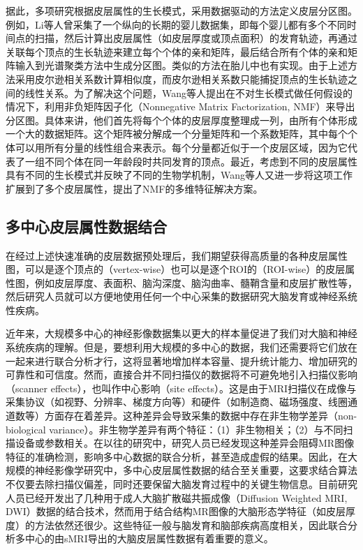 据此，多项研究根据皮层属性的生长模式，采用数据驱动的方法定义皮层分区图。例如，Li等人\cite{li2015parcellation}曾采集了一个纵向的长期的婴儿数据集，即每个婴儿都有多个不同时间点的扫描，然后计算出皮层属性（如皮层厚度或顶点面积）的发育轨迹，再通过关联每个顶点的生长轨迹来建立每个个体的亲和矩阵，最后结合所有个体的亲和矩阵输入到光谱聚类方法中生成分区图。类似的方法在胎儿中也有实现\cite{xia2019fetal}。由于上述方法采用皮尔逊相关系数计算相似度，而皮尔逊相关系数只能捕捉顶点的生长轨迹之间的线性关系。为了解决这个问题，Wang等人\cite{wang2019developmental}提出在不对生长模式做任何假设的情况下，利用非负矩阵因子化（Nonnegative Matrix Factorization, NMF）来导出分区图。具体来讲，他们首先将每个个体的皮层厚度整理成一列，由所有个体形成一个大的数据矩阵。这个矩阵被分解成一个分量矩阵和一个系数矩阵，其中每个个体可以用所有分量的线性组合来表示。每个分量都近似于一个皮层区域，因为它代表了一组不同个体在同一年龄段时共同发育的顶点。最近，考虑到不同的皮层属性具有不同的生长模式并反映了不同的生物学机制，Wang等人又进一步\cite{wang2019revealing}将这项工作扩展到了多个皮层属性，提出了NMF的多维特征解决方案。


\subsection{多中心皮层属性数据结合}\label{sec:绪论_多中心皮层属性数据结合}
在经过上述快速准确的皮层数据预处理后，我们期望获得高质量的各种皮层属性图，可以是逐个顶点的（vertex-wise）也可以是逐个ROI的（ROI-wise）的皮层属性图，例如皮层厚度、表面积、脑沟深度、脑沟曲率、髓鞘含量和皮层扩散性等，然后研究人员就可以方便地使用任何一个中心采集的数据研究大脑发育或神经系统性疾病。

近年来，大规模多中心的神经影像数据集以更大的样本量促进了我们对大脑和神经系统疾病的理解\cite{howell2019unc,li2019computational,glasser2013minimal}。但是，要想利用大规模的多中心的数据，我们还需要将它们放在一起来进行联合分析才行，这将显著地增加样本容量、提升统计能力、增加研究的可靠性和可信度。然而，直接合并不同扫描仪的数据将不可避免地引入扫描仪影响（scanner effects），也叫作中心影响（site effects）。这是由于MRI扫描仪在成像与采集协议（如视野、分辨率、梯度方向等）和硬件（如制造商、磁场强度、线圈通道数等）方面存在着差异。这种差异会导致采集的数据中存在非生物学差异（non-biological variance）。非生物学差异有两个特征：（1）非生物相关；（2）与不同扫描设备或参数相关。在以往的研究中，研究人员已经发现这种差异会阻碍MR图像特征的准确检测\cite{han2006reliability,takao2011effect}，影响多中心数据的联合分析\cite{fortin2018harmonization}，甚至造成虚假的结果\cite{rao2017predictive}。因此，在大规模的神经影像学研究中，多中心皮层属性数据的结合至关重要，这要求结合算法不仅要去除扫描仪偏差，同时还要保留大脑发育过程中的关键生物信息。目前研究人员已经开发出了几种用于成人大脑扩散磁共振成像（Diffusion Weighted MRI, DWI）数据的结合技术\cite{huynh2019multi,karayumak2018harmonizing,karayumak2019retrospective}，然而用于结合结构MR图像的大脑形态学特征（如皮层厚度）的方法依然还很少。这些特征一般与脑发育和脑部疾病高度相关，因此联合分析多中心的由sMRI导出的大脑皮层属性数据有着重要的意义。

